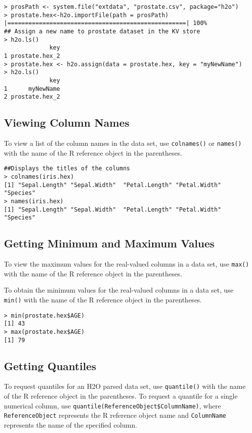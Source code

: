 {\newpage
\begin{lstlisting}[style=R]
> prosPath <- system.file("extdata", "prostate.csv", package="h2o")
> prostate.hex<-h2o.importFile(path = prosPath)
|===================================================| 100%
## Assign a new name to prostate dataset in the KV store
> h2o.ls()
             key
1 prostate.hex_2
> prostate.hex <- h2o.assign(data = prostate.hex, key = "myNewName")
> h2o.ls()
             key
1      myNewName
2 prostate.hex_2

\end{lstlisting}

\subsection{Viewing Column Names}

To view a list of the column names in the data set, use {\texttt{colnames()}} or {\texttt{names()}} with the name of the R reference object in the parentheses.

\begin{lstlisting}[style=R]
##Displays the titles of the columns
> colnames(iris.hex)
[1] "Sepal.Length" "Sepal.Width"  "Petal.Length" "Petal.Width"  "Species"     
> names(iris.hex)
[1] "Sepal.Length" "Sepal.Width"  "Petal.Length" "Petal.Width"  "Species"     
\end{lstlisting}


\subsection{Getting Minimum and Maximum Values}

To view the maximum values for the real-valued columns in a data set, use {\texttt{max()}} with the name of the R reference object in the parentheses.

To obtain the minimum values for the real-valued columns in a data set, use {\texttt{min()}} with the name of the R reference object in the parentheses.
\smallskip
\begin{lstlisting}[style=R]
> min(prostate.hex$AGE)
[1] 43
> max(prostate.hex$AGE)
[1] 79
\end{lstlisting}



\subsection{Getting Quantiles}

To request quantiles for an H2O parsed data set, use {\texttt{quantile()}} with the name of the R reference object in the parentheses.
To request a quantile for a single numerical column, use {\texttt{quantile(ReferenceObject\$ColumnName)}},  where {\texttt{ReferenceObject}} represents the R reference object name and {\texttt{ColumnName}} represents the name of the specified column. 

}
